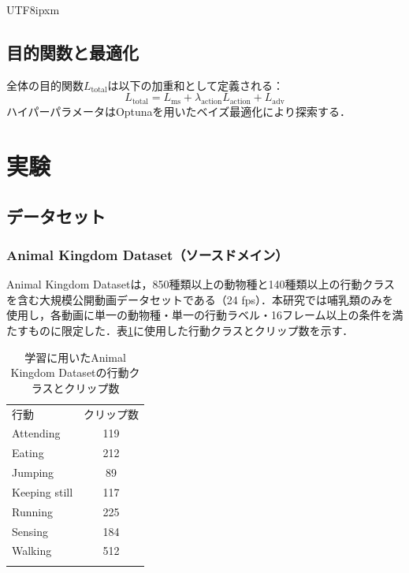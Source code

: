 \documentclass[twocolumn]{svjour3}
\begin{document}
\begin{CJK}{UTF8}{ipxm}
\subsection{目的関数と最適化}

全体の目的関数$L_{\mathrm{total}}$は以下の加重和として定義される：
\begin{equation}
  L_{\mathrm{total}} = L_{\mathrm{ms}} + \lambda_{\mathrm{action}} L_{\mathrm{action}} + L_{\mathrm{adv}}
\end{equation}
ハイパーパラメータはOptuna\cite{akiba2019optuna}を用いたベイズ最適化により探索する．

\section{実験}
\label{sec:experiments}

\subsection{データセット}

\subsubsection{Animal Kingdom Dataset（ソースドメイン）}
Animal Kingdom Dataset\cite{ng2022animal}は，850種類以上の動物種と140種類以上の行動クラスを含む大規模公開動画データセットである（24 fps）．本研究では哺乳類のみを使用し，各動画に単一の動物種・単一の行動ラベル・16フレーム以上の条件を満たすものに限定した．表\ref{tab:ak_actions}に使用した行動クラスとクリップ数を示す．

\begin{table}[t]
  \caption{学習に用いたAnimal Kingdom Datasetの行動クラスとクリップ数}
  \label{tab:ak_actions}
  \begin{tabular}{lc}
    \hline\noalign{\smallskip}
    行動 & クリップ数 \\
    \noalign{\smallskip}\hline\noalign{\smallskip}
    Attending & 119 \\
    Eating & 212 \\
    Jumping & 89 \\
    Keeping still & 117 \\
    Running & 225 \\
    Sensing & 184 \\
    Walking & 512 \\
    \noalign{\smallskip}\hline
  \end{tabular}
\end{table}


\end{CJK}
\end{document}
